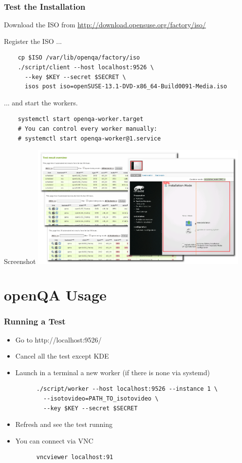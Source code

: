 \documentclass{beamer}
\begin{document}
%
%
\begin{frame}[fragile]
  \frametitle{Test the Installation}
  Download the ISO from
  \url{http://download.opensuse.org/factory/iso/}\newline

  Register the ISO ...
  \lstset{style=mybash}
  \begin{lstlisting}
    cp $ISO /var/lib/openqa/factory/iso
    ./script/client --host localhost:9526 \
      --key $KEY --secret $SECRET \
      isos post iso=openSUSE-13.1-DVD-x86_64-Build0091-Media.iso
  \end{lstlisting}

  ... and start the workers.
  \lstset{style=mybash}
  \begin{lstlisting}
    systemctl start openqa-worker.target
    # You can control every worker manually:
    # systemctl start openqa-worker@1.service
  \end{lstlisting}
\end{frame}

%
%
\begin{frame}{Screenshot}
  \includegraphics[height=6.2cm,width=10.88cm]{screenshot}
\end{frame}


\section{openQA Usage}
%
%
\begin{frame}[fragile]
  \frametitle{Running a Test}
  \begin{itemize}
  \item Go to http://localhost:9526/
  \item Cancel all the test except KDE
  \item Launch in a terminal a new worker (if there is none via systemd)
    \lstset{style=mybash}
    \begin{lstlisting}
      ./script/worker --host localhost:9526 --instance 1 \
        --isotovideo=PATH_TO_isotovideo \
        --key $KEY --secret $SECRET
    \end{lstlisting}
  \item Refresh and see the test running
  \item You can connect via VNC
    \lstset{style=mybash}
    \begin{lstlisting}
      vncviewer localhost:91
    \end{lstlisting}
  \end{itemize}
\end{frame}
\end{document}
